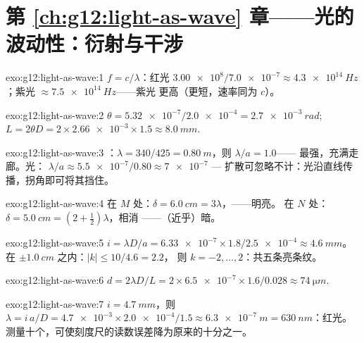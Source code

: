 \section*{第 \ref{ch:g12:light-as-wave} 章——光的波动性：衍射与干涉}

\begin{solution}{exo:g12:light-as-wave:1}
$f = c/\lambda$：红光 $\num{3.00e8}/\num{7.0e-7} \approx
\qty{4.3e14}{Hz}$；紫光 $\approx \qty{7.5e14}{Hz}$——紫光
更高（更短，速率同为 $c$）。
\end{solution}

\begin{solution}{exo:g12:light-as-wave:2}
$\theta = \num{5.32e-7}/\num{2.0e-4} = \qty{2.7e-3}{rad}$;
$L = 2\theta D = 2 \times \num{2.66e-3} \times 1.5 \approx
\qty{8.0}{mm}$.
\end{solution}

\begin{solution}{exo:g12:light-as-wave:3}
：$\lambda = 340/425 = \qty{0.80}{m}$，则 $\lambda/a = 1.0$——
最强，充满走廊。光：
$\lambda/a \approx \num{5.5e-7}/0.80 \approx \num{7e-7}$ ---
扩散可忽略不计：光沿直线传播，拐角即可将其挡住。
\end{solution}

\begin{solution}{exo:g12:light-as-wave:4}
在 $M$ 处：$\delta = \qty{6.0}{cm} = 3\lambda$，——明亮。
在 $N$ 处：$\delta = \qty{5.0}{cm} = (2 + \tfrac12)\lambda$，相消
——（近乎）暗。
\end{solution}

\begin{solution}{exo:g12:light-as-wave:5}
$i = \lambda D/a = \num{6.33e-7} \times 1.8/\num{2.5e-4} \approx
\qty{4.6}{mm}$。在 $\pm\qty{1.0}{cm}$ 之内：$|k| \leq 10/4.6 = 2.2$，
则 $k = -2, \dots, 2$：共五条亮条纹。
\end{solution}

\begin{solution}{exo:g12:light-as-wave:6}
$d = 2\lambda D/L = 2 \times \num{6.5e-7} \times 1.6/0.028 \approx
\qty{74}{\micro m}$.
\end{solution}

\begin{solution}{exo:g12:light-as-wave:7}
$i = \qty{4.7}{mm}$，则 $\lambda = i\,a/D = \num{4.7e-3} \times
\num{2.0e-4}/1.5 \approx \qty{6.3e-7}{m} = \qty{630}{nm}$：红光。
测量十个，可使刻度尺的读数误差降为原来的十分之一。
\end{solution}

